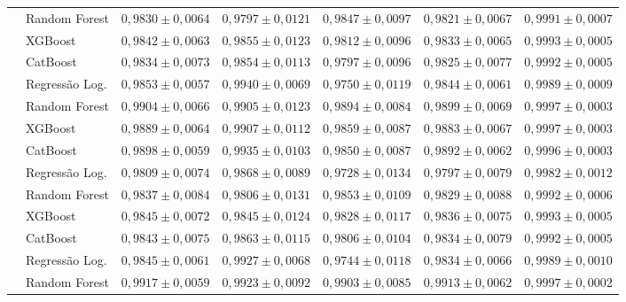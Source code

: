 \begin{table}[htbp]
{\begin{tabular}{llccccc}
 & Random Forest & $0{,}9830 \pm 0{,}0064$ & $0{,}9797 \pm 0{,}0121$ & $0{,}9847 \pm 0{,}0097$ & $0{,}9821 \pm 0{,}0067$ & $0{,}9991 \pm 0{,}0007$ \\
 & XGBoost & $0{,}9842 \pm 0{,}0063$ & $0{,}9855 \pm 0{,}0123$ & $0{,}9812 \pm 0{,}0096$ & $0{,}9833 \pm 0{,}0065$ & $0{,}9993 \pm 0{,}0005$ \\
 & CatBoost & $0{,}9834 \pm 0{,}0073$ & $0{,}9854 \pm 0{,}0113$ & $0{,}9797 \pm 0{,}0096$ & $0{,}9825 \pm 0{,}0077$ & $0{,}9992 \pm 0{,}0005$ \\
\hline
{} & Regressão Log. & $0{,}9853 \pm 0{,}0057$ & $0{,}9940 \pm 0{,}0069$ & $0{,}9750 \pm 0{,}0119$ & $0{,}9844 \pm 0{,}0061$ & $0{,}9989 \pm 0{,}0009$ \\
 & Random Forest & $0{,}9904 \pm 0{,}0066$ & $0{,}9905 \pm 0{,}0123$ & $0{,}9894 \pm 0{,}0084$ & $0{,}9899 \pm 0{,}0069$ & $0{,}9997 \pm 0{,}0003$ \\
 & XGBoost & $0{,}9889 \pm 0{,}0064$ & $0{,}9907 \pm 0{,}0112$ & $0{,}9859 \pm 0{,}0087$ & $0{,}9883 \pm 0{,}0067$ & $0{,}9997 \pm 0{,}0003$ \\
 & CatBoost & $0{,}9898 \pm 0{,}0059$ & $0{,}9935 \pm 0{,}0103$ & $0{,}9850 \pm 0{,}0087$ & $0{,}9892 \pm 0{,}0062$ & $0{,}9996 \pm 0{,}0003$ \\
\hline
{} & Regressão Log. & $0{,}9809 \pm 0{,}0074$ & $0{,}9868 \pm 0{,}0089$ & $0{,}9728 \pm 0{,}0134$ & $0{,}9797 \pm 0{,}0079$ & $0{,}9982 \pm 0{,}0012$ \\
 & Random Forest & $0{,}9837 \pm 0{,}0084$ & $0{,}9806 \pm 0{,}0131$ & $0{,}9853 \pm 0{,}0109$ & $0{,}9829 \pm 0{,}0088$ & $0{,}9992 \pm 0{,}0006$ \\
 & XGBoost & $0{,}9845 \pm 0{,}0072$ & $0{,}9845 \pm 0{,}0124$ & $0{,}9828 \pm 0{,}0117$ & $0{,}9836 \pm 0{,}0075$ & $0{,}9993 \pm 0{,}0005$ \\
 & CatBoost & $0{,}9843 \pm 0{,}0075$ & $0{,}9863 \pm 0{,}0115$ & $0{,}9806 \pm 0{,}0104$ & $0{,}9834 \pm 0{,}0079$ & $0{,}9992 \pm 0{,}0005$ \\
\hline
{} & Regressão Log. & $0{,}9845 \pm 0{,}0061$ & $0{,}9927 \pm 0{,}0068$ & $0{,}9744 \pm 0{,}0118$ & $0{,}9834 \pm 0{,}0066$ & $0{,}9989 \pm 0{,}0010$ \\
 & Random Forest & $0{,}9917 \pm 0{,}0059$ & $0{,}9923 \pm 0{,}0092$ & $0{,}9903 \pm 0{,}0085$ & $0{,}9913 \pm 0{,}0062$ & $0{,}9997 \pm 0{,}0002$ \\

\end{tabular}}
\end{table}
